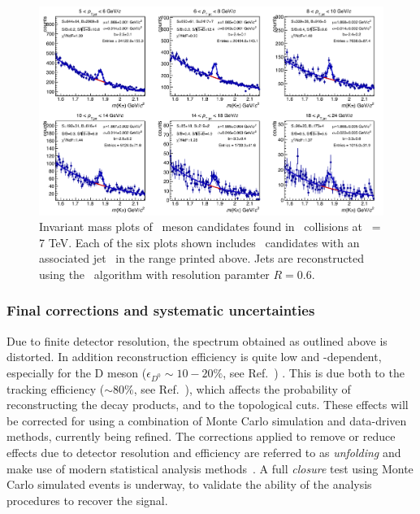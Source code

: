\documentclass[12pt, a4paper, twoside, titlepage]{article}
\begin{document}
\begin{figure}[tb]
\begin{center}
\includegraphics[width=1.0\textwidth]{img/InvMassSingleDiff}
 \caption{Invariant mass plots of \Dzero\ meson candidates found in \pp\ collisions at \s\ = 7 TeV. Each of the six plots shown includes \Dzero\ candidates
 with an associated jet \pt\ in the range printed above. Jets are reconstructed using the \antikt\ algorithm with resolution paramter $R=0.6$.} 
 \label{fig:InvMassSingleDiff}
\end{center}
\end{figure}

\subsubsection{Final corrections and systematic uncertainties}
Due to finite detector resolution, the spectrum obtained as outlined above is distorted. In addition reconstruction efficiency is quite low
and \pt-dependent, especially for the D meson ($\epsilon_{D^0} \sim 10-20\%$, see Ref.~\cite{ALICE:2012d}) . This is due both to the tracking efficiency ($\sim 80\%$, see Ref.~\cite{ALICE:2014b}),
which affects the probability of reconstructing the decay products, and to the topological cuts. These effects will be corrected for using a combination of Monte Carlo simulation and data-driven methods, currently being refined.
The corrections applied to remove or reduce effects due to detector resolution and efficiency are referred to as \emph{unfolding} and make use of modern statistical analysis methods~\cite{Hocker:1995, Dagostini:1995}.
A full \emph{closure} test using Monte Carlo simulated events is underway, to validate the ability of the analysis procedures to recover the signal.
\end{document}
